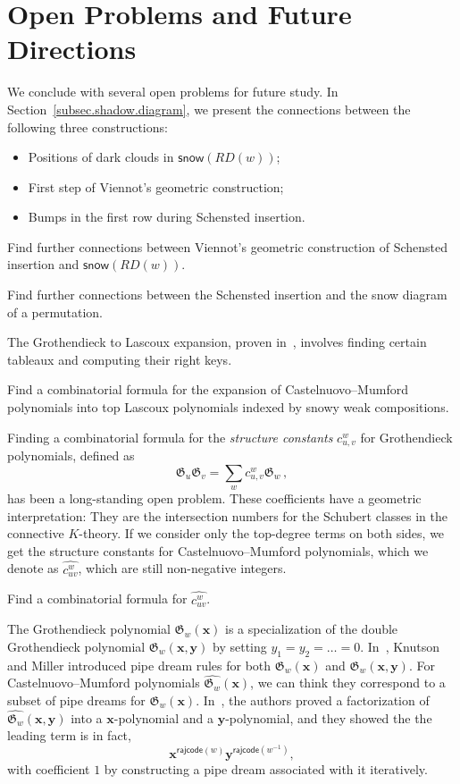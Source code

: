\documentclass[10pt]{amsart}
\theoremstyle{plain}
\theoremstyle{plain}
\theoremstyle{definition}
\theoremstyle{definition}
\theoremstyle{definition}
\theoremstyle{plain}
\theoremstyle{plain}
\theoremstyle{plain}
\theoremstyle{plain}
\theoremstyle{plain}
\theoremstyle{remark}
\theoremstyle{remark}
\theoremstyle{plain}
\theoremstyle{plain}
\newcommand{\fG}{\mathfrak{G}}
\newcommand{\snow}{\mathsf{snow}}
\newcommand{\rajcode}{\mathsf{rajcode}}
\newcommand{\definition}[1]{{\color{darkred}\emph{#1}}}
\begin{document}
\section{Open Problems and Future Directions}\label{sec.open}
We conclude with several open problems for future study.
In Section~\ref{subsec.shadow.diagram}, we present the connections between the
following three constructions:
\begin{itemize}
\item[-] Positions of dark clouds in $\snow(RD(w))$;
\item[-] First step of Viennot's geometric construction;
\item[-] Bumps in the first row during Schensted insertion. 
\end{itemize}

\begin{prob}
Find further connections between Viennot's geometric  construction of Schensted insertion
and $\snow(RD(w))$.
\end{prob}

\begin{prob}
Find further connections between the Schensted insertion and the snow diagram of a permutation.
\end{prob}

The Grothendieck to Lascoux expansion, proven in~\cite{SY}, 
involves finding certain tableaux and computing their right keys.


\begin{prob}
Find a combinatorial formula for the expansion of Castelnuovo--Mumford polynomials
into top Lascoux polynomials indexed by snowy weak compositions. 
\end{prob}

Finding a combinatorial formula for the \definition{structure constants} $c^w_{u,v}$ 
for Grothendieck polynomials, defined as
\[
\fG_u \fG_v = \sum_{w} c^w_{u,v}\fG_w\,,
\] 
has been a long-standing open problem.
These coefficients have a geometric interpretation: They are the intersection 
numbers for the Schubert classes in the connective $K$-theory. 
If we consider only the top-degree terms on both sides, we get the structure 
constants for Castelnuovo--Mumford polynomials, which we denote as $\widehat{c^w_{uv}}$,
which are still non-negative integers.


\begin{prob}
Find a combinatorial formula for $\widehat{c^w_{uv}}$.
\end{prob}

The Grothendieck polynomial $\fG_w(\bm{x})$ is a specialization of the double 
Grothendieck polynomial $\fG_w(\bm{x},\bm{y})$ by setting $y_1=y_2 = \dots = 0$. 
In~\cite{KM}, Knutson and Miller introduced pipe dream rules for both
$\fG_w(\bm{x})$ and $\fG_w(\bm{x},\bm{y})$.
For Castelnuovo--Mumford polynomials $\widehat{\fG_w}(\bm{x})$, we can think they 
correspond to a subset of pipe dreams for $\fG_w(\bm{x})$.
In~\cite{PSW}, the authors proved a factorization of $\widehat{\fG_w}(\bm{x},\bm{y})$
into a $\bm{x}$-polynomial and a $\bm{y}$-polynomial, and they showed the 
the leading term is in fact,
\[
\bm{x}^{\rajcode(w)} \bm{y}^{\rajcode(w^{-1})},
\]
with coefficient $1$ by constructing a pipe dream associated with it iteratively.
\end{document}
